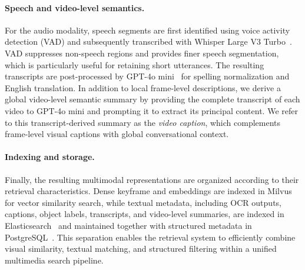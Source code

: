 \documentclass[runningheads]{llncs}
\begin{document}
\paragraph{Speech and video-level semantics.}
For the audio modality, speech segments are first identified using voice activity detection (VAD) and subsequently transcribed with Whisper Large V3 Turbo~\cite{radford2022whisper,whisperLargeV3Turbo}. VAD suppresses non-speech regions and provides finer speech segmentation, which is particularly useful for retaining short utterances. The resulting transcripts are post-processed by GPT-4o mini~\cite{openai2024gpt4omini} for spelling normalization and English translation. In addition to local frame-level descriptions, we derive a global video-level semantic summary by providing the complete transcript of each video to GPT-4o mini and prompting it to extract its principal content. We refer to this transcript-derived summary as the \emph{video caption}, which complements frame-level visual captions with global conversational context.

\paragraph{Indexing and storage.}
Finally, the resulting multimodal representations are organized according to their retrieval characteristics. Dense keyframe and embeddings are indexed in Milvus~\cite{wang2021milvus} for vector similarity search, while textual metadata, including OCR outputs, captions, object labels, transcripts, and video-level summaries, are indexed in Elasticsearch~\cite{elasticsearch2026} and maintained together with structured metadata in PostgreSQL~\cite{postgresql2026}. This separation enables the retrieval system to efficiently combine visual similarity, textual matching, and structured filtering within a unified multimedia search pipeline.


\end{document}
